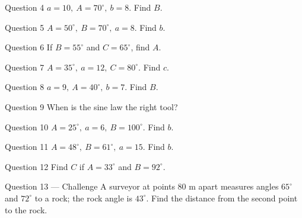 \documentclass[11pt]{article}
\begin{document}
\begin{qbox}{Question 4}
$a=10,\ A=70^\circ,\ b=8$. Find $B$.\workspace{2.2cm}
\end{qbox}

\begin{qbox}{Question 5}
$A=50^\circ,\ B=70^\circ,\ a=8$. Find $b$.\workspace{2.2cm}
\end{qbox}

\begin{qbox}{Question 6}
If $B=55^\circ$ and $C=65^\circ$, find $A$.\workspace{2.4cm}
\end{qbox}

\begin{qbox}{Question 7}
$A=35^\circ,\ a=12,\ C=80^\circ$. Find $c$.\workspace{2.2cm}
\end{qbox}

\begin{qbox}{Question 8}
$a=9,\ A=40^\circ,\ b=7$. Find $B$.\workspace{2.2cm}
\end{qbox}

\begin{qbox}{Question 9}
When is the sine law the right tool?\workspace{2.4cm}
\end{qbox}

\begin{qbox}{Question 10}
$A=25^\circ,\ a=6,\ B=100^\circ$. Find $b$.\workspace{2.2cm}
\end{qbox}

\begin{qbox}{Question 11}
$A=48^\circ,\ B=61^\circ,\ a=15$. Find $b$.\workspace{2.2cm}
\end{qbox}

\begin{qbox}{Question 12}
Find $C$ if $A=33^\circ$ and $B=92^\circ$.\workspace{2.4cm}
\end{qbox}

\begin{qbox}{Question 13 --- Challenge}
A surveyor at points $80$ m apart measures angles $65^\circ$ and $72^\circ$ to a rock; the rock angle is $43^\circ$. Find the distance from the second point to the rock.\workspace{3cm}
\end{qbox}

\clearpage
{}
\end{document}
